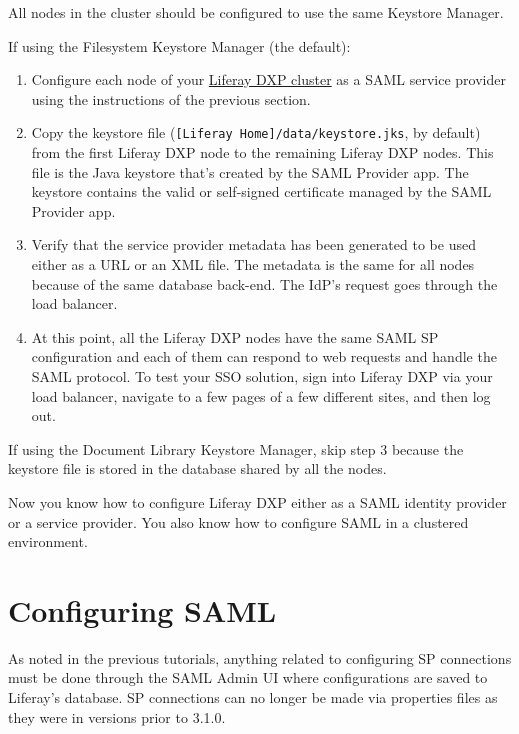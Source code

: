 All nodes in the cluster should be configured to use the same Keystore
Manager.

If using the Filesystem Keystore Manager (the default):

\begin{enumerate}
\def\labelenumi{\arabic{enumi}.}
\item
  Configure each node of your
  \href{/docs/7-0/deploy/-/knowledge_base/d/liferay-clustering}{Liferay
  DXP cluster} as a SAML service provider using the instructions of the
  previous section.
\item
  Copy the keystore file
  (\texttt{{[}Liferay\ Home{]}/data/keystore.jks}, by default) from the
  first Liferay DXP node to the remaining Liferay DXP nodes. This file is
  the Java keystore that's created by the SAML Provider app. The
  keystore contains the valid or self-signed certificate managed by the
  SAML Provider app.
\item
  Verify that the service provider metadata has been generated to be
  used either as a URL or an XML file. The metadata is the same for all
  nodes because of the same database back-end. The IdP's request goes
  through the load balancer.
\item
  At this point, all the Liferay DXP nodes have the same SAML SP
  configuration and each of them can respond to web requests and handle
  the SAML protocol. To test your SSO solution, sign into Liferay DXP
  via your load balancer, navigate to a few pages of a few different
  sites, and then log out.
\end{enumerate}

If using the Document Library Keystore Manager, skip step 3 because the
keystore file is stored in the database shared by all the nodes.

Now you know how to configure Liferay DXP either as a SAML identity
provider or a service provider. You also know how to configure SAML in a
clustered environment.

\section{Configuring SAML}\label{configuring-saml}

As noted in the previous tutorials, anything related to configuring SP
connections must be done through the SAML Admin UI where configurations
are saved to Liferay's database. SP connections can no longer be made
via properties files as they were in versions prior to 3.1.0.


